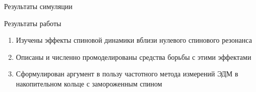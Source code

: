 \documentclass[14pt]{beamer}
\begin{document}
\begin{frame}{Результаты симуляции}
	\centering
\end{frame}

\begin{frame}{Результаты работы}
	\begin{enumerate}
		\item Изучены эффекты спиновой динамики вблизи нулевого спинового резонанса
		\item Описаны и численно промоделированы средства борьбы с этими эффектами
		\item Сформулирован аргумент в пользу частотного метода измерений ЭДМ в накопительном кольце с замороженным спином
	\end{enumerate}
\end{frame}

\end{document}
